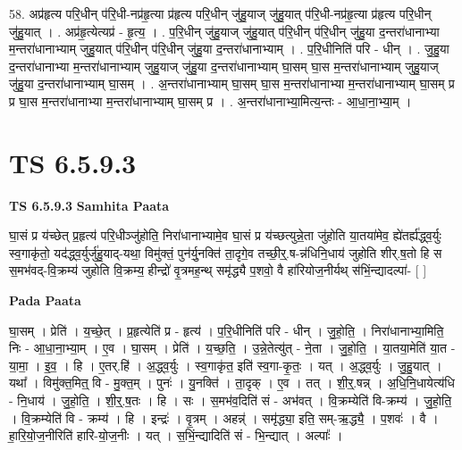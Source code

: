 \documentclass[17pt]{extarticle}
\begin{document}
58. अप्र॑हृत्य परि॒धीन् प॑रि॒धी-नप्र॑हृ॒त्या प्र॑हृत्य परि॒धीन् जु॑हु॒याज् जु॑हु॒यात् प॑रि॒धी-नप्र॑हृ॒त्या प्र॑हृत्य परि॒धीन् जु॑हु॒यात् । . अप्र॑हृ॒त्येत्यप्र॑ - हृ॒त्य॒ । . प॒रि॒धीन् जु॑हु॒याज् जु॑हु॒यात् प॑रि॒धीन् प॑रि॒धीन् जु॑हु॒या द॒न्तरा॑धानाभ्या म॒न्तरा॑धानाभ्याम् जुहु॒यात् प॑रि॒धीन् प॑रि॒धीन् जु॑हु॒या द॒न्तरा॑धानाभ्याम् । . प॒रि॒धीनिति॑ परि - धीन् । . जु॒हु॒या द॒न्तरा॑धानाभ्या म॒न्तरा॑धानाभ्याम् जुहु॒याज् जु॑हु॒या द॒न्तरा॑धानाभ्याम् घा॒सम् घा॒स म॒न्तरा॑धानाभ्याम् जुहु॒याज् जु॑हु॒या द॒न्तरा॑धानाभ्याम् घा॒सम् । . अ॒न्तरा॑धानाभ्याम् घा॒सम् घा॒स म॒न्तरा॑धानाभ्या म॒न्तरा॑धानाभ्याम् घा॒सम् प्र प्र घा॒स म॒न्तरा॑धानाभ्या म॒न्तरा॑धानाभ्याम् घा॒सम् प्र । . अ॒न्तरा॑धानाभ्या॒मित्य॒न्तः - आ॒धा॒ना॒भ्या॒म् । \newline
\pagebreak
{}

\section{ TS 6.5.9.3 }

\textbf{TS 6.5.9.3 } \newline
\textbf{Samhita Paata} \newline

घा॒सं प्र य॑च्छेत् प्र॒हृत्य॑ परि॒धीञ्जु॑होति॒ निरा॑धानाभ्यामे॒व घा॒सं प्र य॑च्छत्युन्ने॒ता जु॑होति या॒तया॑मेव॒ ह्ये॑तर्ह्य॑द्ध्व॒र्युः स्व॒गाकृ॑तो॒ यद॑द्ध्व॒र्युर्जु॑हु॒याद्-यथा॒ विमु॑क्तं॒ पुन॑र्यु॒नक्ति॑ ता॒दृगे॒व तच्छी॒र्॒.ष-न्न॑धिनि॒धाय॑ जुहोति शीर्.ष॒तो हि स स॒मभ॑वद्-वि॒क्रम्य॑ जुहोति वि॒क्रम्य॒ हीन्द्रो॑ वृ॒त्रमह॒न्थ् समृ॑द्ध्यै प॒शवो॒ वै हा॑रियोज॒नीर्यथ् स॑भिं॒न्द्यादल्पा॑- [  ] \newline

\textbf{Pada Paata} \newline

घा॒सम् । प्रेति॑ । य॒च्छे॒त् । प्र॒हृत्येति॑ प्र - हृत्य॑ । प॒रि॒धीनिति॑ परि - धीन् । जु॒हो॒ति॒ । निरा॑धानाभ्या॒मिति॒ निः - आ॒धा॒ना॒भ्या॒म् । ए॒व । घा॒सम् । प्रेति॑ । य॒च्छ॒ति॒ । उ॒न्ने॒तेत्यु॑त् - ने॒ता । जु॒हो॒ति॒ । या॒तया॒मेति॑ या॒त - या॒मा॒ । इ॒व॒ । हि । ए॒तर्.हि॑ । अ॒द्ध्व॒र्युः । स्व॒गाकृ॑त॒ इति॑ स्व॒गा-कृ॒तः॒ । यत् । अ॒द्ध्व॒र्युः । जु॒हु॒यात् । यथा᳚ । विमु॑क्त॒मित्॒ वि - मु॒क्त॒म् । पुनः॑ । यु॒नक्ति॑ । ता॒दृक् । ए॒व । तत् । शी॒र्॒.षन्न् । अ॒धि॒नि॒धायेत्य॑धि - नि॒धाय॑ । जु॒हो॒ति॒ । शी॒र्॒.ष॒तः । हि । सः । स॒मभ॑व॒दिति॑ सं - अभ॑वत् । वि॒क्रम्येति॑ वि-क्रम्य॑ । जु॒हो॒ति॒ । वि॒क्रम्येति॑ वि - क्रम्य॑ । हि । इन्द्रः॑ । वृ॒त्रम् । अहन्न्॑ । समृ॑द्ध्या॒ इति॒ सम्-ऋ॒द्ध्यै॒ । प॒शवः॑ । वै । हा॒रि॒यो॒ज॒नीरिति॑ हारि-यो॒ज॒नीः । यत् । स॒भिं॒न्द्यादिति॑ सं - भि॒न्द्यात् । अल्पाः᳚ ।  \newline
\end{document}
